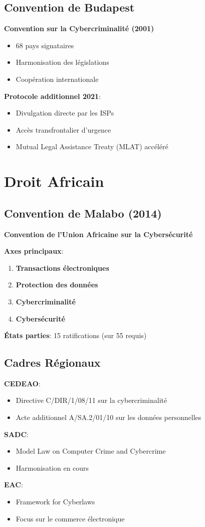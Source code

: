 \subsection{Convention de Budapest}
\textbf{Convention sur la Cybercriminalité (2001)}

\begin{itemize}
\item 68 pays signataires
\item Harmonisation des législations
\item Coopération internationale
\end{itemize}

\textbf{Protocole additionnel 2021}:

\begin{itemize}
\item Divulgation directe par les ISPs
\item Accès transfrontalier d'urgence
\item Mutual Legal Assistance Treaty (MLAT) accéléré
\end{itemize}

\section{Droit Africain}
\subsection{Convention de Malabo (2014)}
\textbf{Convention de l'Union Africaine sur la Cybersécurité}

\textbf{Axes principaux}:

\begin{enumerate}
\item \textbf{Transactions électroniques}
\item \textbf{Protection des données}
\item \textbf{Cybercriminalité}
\item \textbf{Cybersécurité}
\end{enumerate}

\textbf{États parties}: 15 ratifications (sur 55 requis)

\subsection{Cadres Régionaux}
\textbf{CEDEAO}:

\begin{itemize}
\item Directive C/DIR/1/08/11 sur la cybercriminalité
\item Acte additionnel A/SA.2/01/10 sur les données personnelles
\end{itemize}

\textbf{SADC}:

\begin{itemize}
\item Model Law on Computer Crime and Cybercrime
\item Harmonisation en cours
\end{itemize}

\textbf{EAC}:

\begin{itemize}
\item Framework for Cyberlaws
\item Focus sur le commerce électronique
\end{itemize}